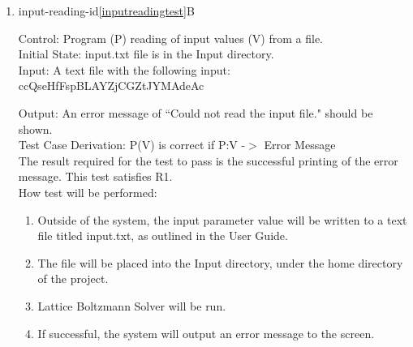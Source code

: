 \documentclass[12pt, titlepage]{article}
\newcommand{\famname}{Lattice Boltzmann Solver}
\begin{document}
\begin{enumerate}
Test Case Derivation: P(V) is correct if P:V -$>$ O and O = V\\

The result required for the test to pass is the successful printing of all input
values to the screen. This test satisfies R1.\\
					
How test will be performed: 

\begin{enumerate}
\item Outside of the system, the input parameter values will be written to a text file titled input.txt, as outlined in the User Guide.
\item The file will be placed into the Input directory, under the home directory
  of the project.
\item The input reading module will be modified to print the input data prior to verifying it.  
\item {\famname} will be run.
\item If successful, The system will output the input parameters to the screen.
\end{enumerate}

\item{input-reading-id\ref{inputreadingtest}B\\}

Control: Program (P) reading of input values (V) from a file.\\

Initial State: input.txt file is in the Input directory.\\

Input: A text file with the following input:\\
ccQseHfFspBLAYZjCGZtJYMAdeAc

Output: An error message of ``Could not read the input file." should be shown.\\

Test Case Derivation: P(V) is correct if P:V -$>$ Error Message \\

The result required for the test to pass is the successful printing of the error message. This test satisfies R1.\\

How test will be performed: 

\begin{enumerate}
\item Outside of the system, the input parameter value will be written to a text file titled input.txt, as outlined in the User Guide.
\item The file will be placed into the Input directory, under the home directory
  of the project.
\item {\famname} will be run.
\item If successful, the system will output an error message to the screen.
\end{enumerate}

\end{enumerate}
			
\end{document}
